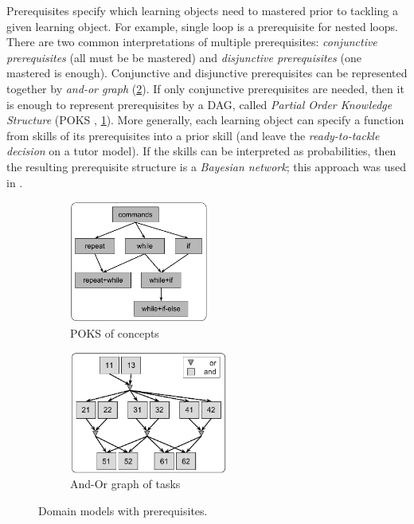 Prerequisites specify which learning objects need to mastered prior to
tackling a given learning object.
For example, single loop is a prerequisite for nested loops.
There are two common interpretations of multiple prerequisites:
\emph{conjunctive prerequisites} (all must be be mastered)
and \emph{disjunctive prerequisites} (one mastered is enough).
Conjunctive and disjunctive prerequisites can be represented together by
\emph{and-or graph} (\cref{fig:prerequisites-and-or}).
If only conjunctive prerequisites are needed, then it is enough to represent
prerequisites by a DAG, called \emph{Partial Order Knowledge Structure}
(POKS \cite{poks}, \cref{fig:prerequisites-poks}).
More generally, each learning object can specify a function from skills of
its prerequisites
into a prior skill (and leave the \emph{ready-to-tackle decision} on a tutor model).
If the skills can be interpreted as probabilities, then the resulting prerequisite structure
is a \emph{Bayesian network}; this approach was used in \cite{its-programming}.


\begin{figure}[htb]
\centering
\begin{subfigure}[t]{0.45\textwidth}
\centering
\includegraphics[height=40mm]{img/prerequisites-poks}
\caption{POKS of concepts}
\label{fig:prerequisites-poks}
\end{subfigure}%
\begin{subfigure}[t]{0.55\textwidth}
\centering
\includegraphics[height=40mm]{img/prerequisites-and-or}
\caption{And-Or graph of tasks}
\label{fig:prerequisites-and-or}
\end{subfigure}
\caption{Domain models with prerequisites.}
\label{fig:chunks-prerequisites}
\end{figure}


